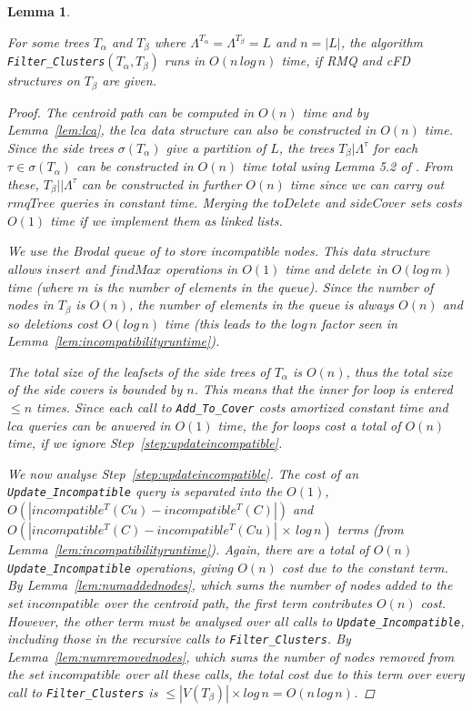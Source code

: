 \documentclass{article}
\newcommand{\leafset}{\Lambda}
\newcommand{\TA}{T_\alpha}
\newcommand{\TB}{T_\beta}
\newtheorem{filterclustersruntime}[incompatibility]{Lemma}
\begin{document}
    \medskip
    \begin{filterclustersruntime}
        \label{lem:filterclustersruntime}

        For some trees $\TA$ and $\TB$ where $\leafset^{\TA} = \leafset^{\TB} = L$ and $n = |L|$, the algorithm \texttt{Filter\_Clusters}$(\TA, \TB)$ runs in $O(n\,log\,n)$ time, if RMQ and cFD structures on $\TB$ are given.

        \begin{proof}
            The centroid path can be computed in $O(n)$ time and by Lemma~\ref{lem:lca}, the $lca$ data structure can also be constructed in $O(n)$ time. Since the side trees $\sigma(\TA)$ give a partition of $L$, the trees $\TB|\leafset^{\tau}$ for each $\tau \in \sigma(\TA)$ can be constructed in $O(n)$ time total using Lemma 5.2 of \cite{farach1995fast}. From these, $\TB||\leafset^{\tau}$ can be constructed in further $O(n)$ time since we can carry out $rmqTree$ queries in constant time. Merging the $toDelete$ and $sideCover$ sets costs $O(1)$ time if we implement them as linked lists.

            We use the Brodal queue of \cite{brodal1995fast} to store incompatible nodes. This data structure allows $insert$ and $findMax$ operations in $O(1)$ time and $delete$ in $O(log\,m)$ time (where $m$ is the number of elements in the queue). Since the number of nodes in $\TB$ is $O(n)$, the number of elements in the queue is always $O(n)$ and so deletions cost $O(log\,n)$ time (this leads to the $log\,n$ factor seen in Lemma~\ref{lem:incompatibilityruntime}).

            The total size of the leafsets of the side trees of $\TA$ is $O(n)$, thus the total size of the side covers is bounded by $n$. This means that the inner for loop is entered $\leq n$ times. Since each call to \texttt{Add\_To\_Cover} costs amortized constant time and $lca$ queries can be anwered in $O(1)$ time, the for loops cost a total of $O(n)$ time, if we ignore Step~\ref{step:updateincompatible}.

            We now analyse Step~\ref{step:updateincompatible}. The cost of an \texttt{Update\_Incompatible} query is separated into the $O(1)$,\\ $O(|incompatible^{T}(Cu) - incompatible^{T}(C)|)$ and $O(|incompatible^{T}(C) - incompatible^{T}(Cu)|\,\times\,log\,n)$ terms (from Lemma~\ref{lem:incompatibilityruntime}). Again, there are a total of $O(n)$ \texttt{Update\_Incompatible} operations, giving $O(n)$ cost due to the constant term. By Lemma~\ref{lem:numaddednodes}, which sums the number of nodes added to the set $incompatible$ over the centroid path, the first term contributes $O(n)$ cost. However, the other term must be analysed over all calls to \texttt{Update\_Incompatible}, including those in the recursive calls to \texttt{Filter\_Clusters}. By Lemma~\ref{lem:numremovednodes}, which sums the number of nodes removed from the set $incompatible$ over all these calls, the total cost due to this term over every call to \texttt{Filter\_Clusters} is $\leq |V(\TB)| \times log\,n = O(n\,log\,n)$.


\end{proof}
\end{filterclustersruntime}
\end{document}
